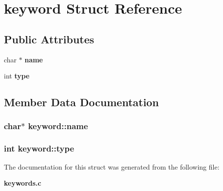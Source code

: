 \section{keyword Struct Reference}
\label{structkeyword}
\subsection*{Public Attributes}
\begin{CompactItemize}
\item 
char $\ast$ {\bf name}
\item 
int {\bf type}
\end{CompactItemize}


\subsection{Member Data Documentation}
\subsubsection{\setlength{\rightskip}{0pt plus 5cm}char$\ast$ keyword::name}\label{structkeyword_m0}


\subsubsection{\setlength{\rightskip}{0pt plus 5cm}int keyword::type}\label{structkeyword_m1}




The documentation for this struct was generated from the following file:\begin{CompactItemize}
\item 
{\bf keywords.c}\end{CompactItemize}
